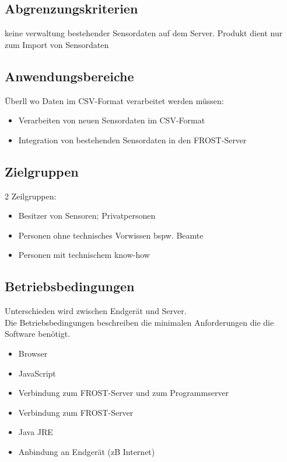 \documentclass[12 pt]{article}
\begin{document}
\subsection{Abgrenzungskriterien}
keine verwaltung bestehender Sensordaten auf dem Server. Produkt dient nur zum Import von Sensordaten

\subsection{Anwendungsbereiche}
Überll wo Daten im CSV-Format verarbeitet werden müssen: \\
\begin{itemize}
\item Verarbeiten von neuen Sensordaten im CSV-Format
\item Integration von bestehenden Sensordaten in den FROST-Server
\end{itemize}

\subsection{Zielgruppen}
2 Zeilgruppen:
\begin{itemize}
\item Besitzer von Sensoren; Privatpersonen
\item Personen ohne technisches Vorwissen bspw. Beamte
\item Personen mit technischem know-how
\end{itemize}

\subsection{Betriebsbedingungen}
Unterschieden wird zwischen Endgerät und Server. \\
Die Betriebsbedingungen beschreiben die minimalen Anforderungen die die Software benötigt.
\begin{itemize}
	\item Browser
	\item JavaScript
	\item Verbindung zum FROST-Server und zum Programmserver
\end{itemize}
\begin{itemize}
	\item Verbindung zum FROST-Server
	\item Java JRE
	\item Anbindung an Endgerät (zB Internet)
\end{itemize}
\end{document}
